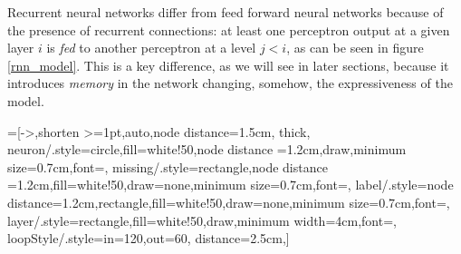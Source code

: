 Recurrent neural networks differ from feed forward neural networks because of the presence of recurrent connections: at least one perceptron output at a given layer $i$ is \textit{fed} to another perceptron
at a level $j<i$, as can be seen in figure \ref{rnn_model}. 
This is a key difference, as we will see in later sections, because it introduces \textit{memory} in the network changing, somehow, the expressiveness
of the model.


=[->,shorten >=1pt,auto,node distance=1.5cm,
  thick,
  neuron/.style={circle,fill=white!50,node distance =1.2cm,draw,minimum size=0.7cm,font=\sffamily\Large\bfseries},
  missing/.style={rectangle,node distance =1.2cm,fill=white!50,draw=none,minimum size=0.7cm,font=\sffamily\Huge\bfseries},
  label/.style={node distance=1.2cm,rectangle,fill=white!50,draw=none,minimum size=0.7cm,font=\sffamily\normalsize},
  layer/.style={rectangle,fill=white!50,draw,minimum width=4cm,font=\sffamily\normalsize},
  loopStyle/.style={in=120,out=60, distance=2.5cm},]
